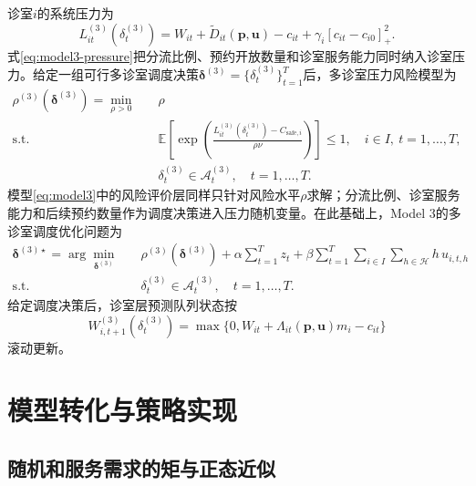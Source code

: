 \documentclass[a4paper,zihao=-4]{ctexart}
\newcommand{\E}{\mathbb{E}}
\numberwithin{figure}{section}
\numberwithin{table}{section}
\begin{document}
诊室$i$的系统压力为
\begin{equation}
L_{it}^{(3)}(\delta_t^{(3)})
=W_{it}+\tilde D_{it}(\bm p,\bm u)-c_{it}
+\gamma_i[c_{it}-c_{i0}]_+^2.
\label{eq:model3-pressure}
\end{equation}
式\eqref{eq:model3-pressure}把分流比例、预约开放数量和诊室服务能力同时纳入诊室压力。给定一组可行多诊室调度决策$\bm\delta^{(3)}=\{\delta_t^{(3)}\}_{t=1}^T$后，多诊室压力风险模型为
\begin{equation}
\begin{aligned}
\rho^{(3)}(\bm\delta^{(3)})
=\min_{\rho>0}\quad
& \rho\\
\mathrm{s.t.}\quad
& \E\left[\exp\left(\frac{L_{it}^{(3)}(\delta_t^{(3)})-C_{\mathrm{safe},i}}{\rho\nu}\right)\right]\leq 1,\quad i\in I,\ t=1,\ldots,T,\\
& \delta_t^{(3)}\in\mathcal A_t^{(3)},\quad t=1,\ldots,T.
\end{aligned}
\label{eq:model3}
\end{equation}
模型\eqref{eq:model3}中的风险评价层同样只针对风险水平$\rho$求解；分流比例、诊室服务能力和后续预约数量作为调度决策进入压力随机变量。在此基础上，Model 3的多诊室调度优化问题为
\begin{equation}
\begin{aligned}
\bm\delta^{(3)\star}
=\arg\min_{\bm\delta^{(3)}}\quad
&\rho^{(3)}(\bm\delta^{(3)})
+\alpha\sum_{t=1}^T z_t
+\beta\sum_{t=1}^T\sum_{i\in I}\sum_{h\in\mathcal H}h\,u_{i,t,h}\\
\mathrm{s.t.}\quad
&\delta_t^{(3)}\in\mathcal A_t^{(3)},\quad t=1,\ldots,T .
\end{aligned}
\label{eq:model3-scheduling}
\end{equation}
给定调度决策后，诊室层预测队列状态按
\begin{equation}
W_{i,t+1}^{(3)}(\delta_t^{(3)})
=\max\{0,W_{it}+\Lambda_{it}(\bm p,\bm u)m_i-c_{it}\}
\end{equation}
滚动更新。

\section{模型转化与策略实现}

\subsection{随机和服务需求的矩与正态近似}
\end{document}
